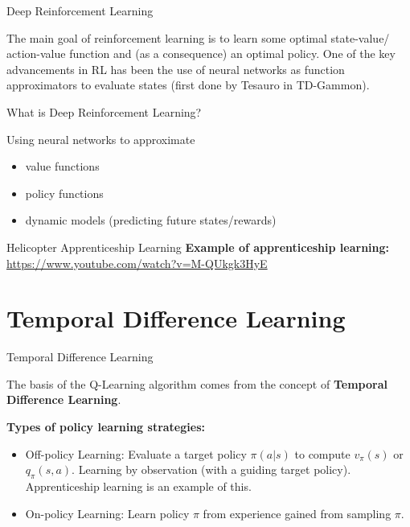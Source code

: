 \documentclass[10pt]{beamer}
\begin{document}
\begin{frame}{Deep Reinforcement Learning}

  The main goal of reinforcement learning is to learn some optimal state-value/
  action-value function and (as a consequence) an optimal policy.
  One of the key advancements in RL has been the use of neural networks
  as function approximators to evaluate states (first done by Tesauro in
  TD-Gammon).

\end{frame}

\begin{frame}{What is Deep Reinforcement Learning?}

  Using neural networks to approximate
  \begin{itemize}
    \item value functions
    \item policy functions
    \item dynamic models (predicting future states/rewards)
  \end{itemize}

\end{frame}

\begin{frame}{Helicopter Apprenticeship Learning}
    \textbf{Example of apprenticeship learning:} \url{https://www.youtube.com/watch?v=M-QUkgk3HyE}
\end{frame}

\section{Temporal Difference Learning}

\begin{frame}{Temporal Difference Learning}

  The basis of the Q-Learning algorithm comes from the concept of
  \textbf{Temporal Difference Learning}.

  \textbf{Types of policy learning strategies:}
  \begin{itemize}
    \item Off-policy Learning: Evaluate a target policy $\pi(a|s)$ to compute
    $v_\pi(s)$ or $q_\pi(s,a)$. Learning by observation (with a guiding
    target policy). Apprenticeship learning is an example of this.
    \item On-policy Learning: Learn policy $\pi$ from experience gained from
    sampling $\pi$.
  \end{itemize}

\end{frame}
\end{document}
